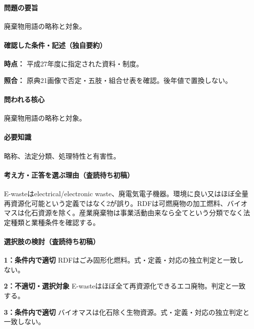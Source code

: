 \paragraph{問題の要旨} 廃棄物用語の略称と対象。

\paragraph{確認した条件・記述（独自要約）}\mbox{}\par

\noindent\textbf{時点：} 平成27年度に指定された資料・制度。\par

\noindent\textbf{照合：} 原典21画像で否定・五肢・組合せ表を確認。後年値で置換しない。\par

\paragraph{問われる核心} 廃棄物用語の略称と対象。

\paragraph{必要知識} 略称、法定分類、処理特性と有害性。

\paragraph{考え方・正答を選ぶ理由（査読待ち初稿）} E-wasteはelectrical/electronic waste、廃電気電子機器。環境に良い又はほぼ全量再資源化可能という定義ではなく2が誤り。RDFは可燃廃物の加工燃料、バイオマスは化石資源を除く。産業廃棄物は事業活動由来なら全てという分類でなく法定種類と業種条件を確認する。

\paragraph{選択肢の検討（査読待ち初稿）}\mbox{}\par

\noindent\textbf{1：条件内で適切} RDFはごみ固形化燃料。式・定義・対応の独立判定と一致しない。\par

\noindent\textbf{2：不適切・選択対象} E-wasteはほぼ全て再資源化できるエコ廃物。判定と一致する。\par

\noindent\textbf{3：条件内で適切} バイオマスは化石除く生物資源。式・定義・対応の独立判定と一致しない。\par

